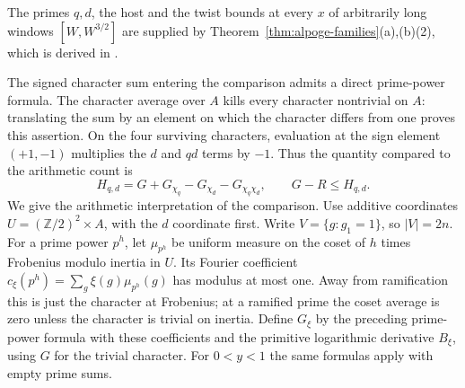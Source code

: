 \documentclass[10pt]{amsart}
\theoremstyle{definition}
\theoremstyle{remark}
\begin{document}
The primes $q,d$, the host and the twist bounds at every $x$ of arbitrarily
long windows $[W,W^{3/2}]$ are supplied by
Theorem~\ref{thm:alpoge-families}(a),(b)(2), which is derived in
\cite[Section~\ref{A-i4:sec}]{Annex}.

The signed character sum entering the comparison admits a direct
prime-power formula. The character average over $A$ kills every
character nontrivial on $A$: translating the sum by an element on
which the character differs from one proves this assertion. On the
four surviving characters, evaluation at the sign element $(+1,-1)$
multiplies the $d$ and $qd$ terms by $-1$. Thus the quantity compared
to the arithmetic count is
\[
 H_{q,d}=G+G_{\chi_q}-G_{\chi_d}-G_{\chi_q\chi_d},
 \qquad G-R\le H_{q,d}.
\]
We give the arithmetic interpretation of the comparison. Use additive
coordinates $U=(\mathbb Z/2)^2\times A$, with the $d$ coordinate
first. Write $V=\{g:g_1=1\}$, so $|V|=2n$. For a prime power
$p^h$, let $\mu_{p^h}$ be uniform measure on the coset of $h$
times Frobenius modulo inertia in $U$. Its Fourier coefficient
$c_\xi(p^h)=\sum_g\xi(g)\mu_{p^h}(g)$ has modulus at most one.
Away from ramification this is just the character at Frobenius;
at a ramified prime the coset average is zero unless the character
is trivial on inertia. Define $G_\xi$ by the preceding prime-power
formula with these coefficients and the primitive logarithmic
derivative $B_\xi$, using $G$ for the trivial character. For $0<y<1$ the same
formulas apply with empty prime sums.
\end{document}
